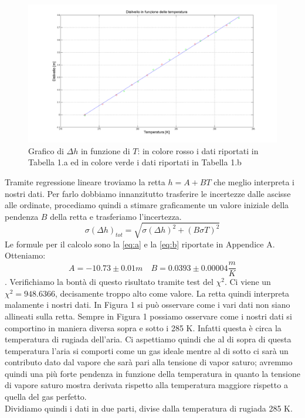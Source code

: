 \begin{figure}[H]
\centering
\includegraphics[width=\textwidth]{img/1}
\caption{Grafico di $\Delta h$ in funzione di $T$: in colore rosso i dati riportati in Tabella 1.a ed in colore verde i dati riportati in Tabella 1.b }
\end{figure}

Tramite regressione lineare troviamo la retta $h = A+BT$ che meglio interpreta i nostri dati. 
Per farlo dobbiamo innanzitutto trasferire le incertezze dalle ascisse alle ordinate, procediamo quindi a stimare graficamente un valore iniziale della pendenza $B$ della retta e trasferiamo l'incertezza.
\begin{equation}
\label{eq:propagazione}
\sigma(\Delta h)_{tot} = \sqrt{\sigma(\Delta h)^2 + (B\sigma T)^2}
\end{equation}
Le formule per il calcolo sono la \eqref{eq:a} e la \eqref{eq:b} riportate in Appendice A. 
Otteniamo:
\[A = -10.73 \pm 0.01 m \quad  B = 0.0393 \pm  0.00004 \frac{m}{K} \] .
Verifichiamo la bontà di questo risultato tramite test del $\chi^2$. 
Ci viene un $\chi^2 = 948.6366$, decisamente troppo alto come valore.
La retta quindi interpreta malamente i nostri dati. 
In Figura 1 si può osservare come i vari dati non siano allineati sulla retta. 
Sempre in Figura 1 possiamo osservare come i nostri dati si comportino in maniera diversa sopra e sotto i 285 K. 
Infatti questa è circa la temperatura di rugiada dell'aria. 
Ci aspettiamo quindi che al di sopra di questa temperatura l'aria si comporti come un gas ideale mentre al di sotto ci sarà un contributo dato dal vapore che sarà pari alla tensione di vapor saturo; avremmo quindi una più forte pendenza in funzione della temperatura in quanto la tensione di vapore saturo mostra derivata rispetto alla temperatura maggiore rispetto a quella del gas perfetto.\\
\newline
Dividiamo quindi i dati in due parti, divise dalla temperatura di rugiada 285 K.

